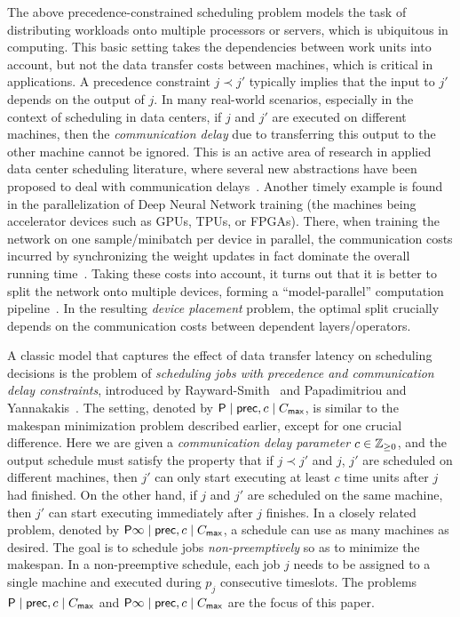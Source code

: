 The above precedence-constrained scheduling problem models the task of distributing workloads onto multiple processors or servers, which is ubiquitous in computing.
This basic setting takes the dependencies between work units into account, but not the data transfer costs between machines, which is critical in applications. 
A precedence constraint $j \prec j'$ typically implies that the input to $j'$ depends on the output of $j$.
In many real-world scenarios, especially in the context of scheduling in data centers, if $j$ and $j'$ are executed on different machines, then the {\em communication delay} due to transferring this output to the other machine cannot be ignored.
This is an active area of research in applied data center scheduling literature, where several new abstractions have been proposed to deal with communication delays~\cite{Chowdhury, guo2012spotting,hong2012finishing,shymyrbay2018meeting,zhang2012optimizing,zhao2015rapier,luo2016towards}.
 Another timely example is found in the parallelization of Deep Neural Network training
(the machines being accelerator devices such as GPUs, TPUs, or FPGAs).
There, when training the network on one sample/minibatch per device in parallel, the communication costs incurred by synchronizing the weight updates in fact dominate the overall running time~\cite{narayanan2018pipedream}.
Taking these costs into account,
it turns out that
it is better to split the network onto multiple devices, forming a ``model-parallel'' computation pipeline~\cite{huang2019gpipe}.
In the resulting \emph{device placement} problem,
the optimal split crucially depends on the communication costs
between dependent layers/operators.


\medskip

A classic model that captures the effect of data transfer latency on scheduling decisions is the problem of {\em scheduling jobs with precedence and communication delay constraints}, introduced by Rayward-Smith~\cite{RAYWARDSMITH1987} and Papadimitriou and Yannakakis~\cite{PapadimitriouY90}.
The setting, denoted by $\mathsf{P} \mid \mathsf{prec}, c \mid C_{\mathsf{max}}$, is similar to the makespan minimization problem described earlier, except for one crucial difference.
Here  we are  given a {\em communication delay parameter} $c \in  \mathbb{Z}_{\ge 0}$, and the output schedule must satisfy the property that if $j \prec j'$ and $j$, $j'$ are scheduled on {different machines}, then $j'$ can only start executing at least $c$ time units after $j$ had finished. 
On the other hand,  if $j$ and $j'$ are scheduled on the {same machine}, then $j'$ can start executing immediately after $j$ finishes. 
In a closely related problem, denoted by $\mathsf{P} \infty \mid \mathsf{prec}, c \mid C_{\mathsf{max}}$, a schedule can use as many machines as desired.
The goal is to schedule jobs {\em non-preemptively} so as to minimize the makespan.  In a non-preemptive schedule, each job $j$ needs to be  assigned to a single machine and executed during $p_j$ consecutive timeslots.
The problems $\mathsf{P} \mid \mathsf{prec}, c \mid C_{\mathsf{max}}$ and $\mathsf{P} \infty \mid \mathsf{prec}, c \mid C_{\mathsf{max}}$ are the focus of this paper.

